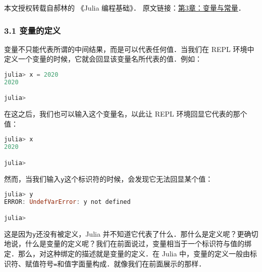 
本文授权转载自郝林的 《Julia 编程基础》． 原文链接：\href{https://github.com/hyper0x/JuliaBasics/blob/master/book/ch03.md}{第3章：变量与常量}．

\subsubsection{3.1 变量的定义}

变量不只能代表所谓的中间结果，而是可以代表任何值．当我们在 REPL 环境中定义一个变量的时候，它就会回显该变量名所代表的值．例如：

\begin{lstlisting}[language=julia]
julia> x = 2020
2020

julia> 
\end{lstlisting}

在这之后，我们也可以输入这个变量名，以此让 REPL 环境回显它代表的那个值：

\begin{lstlisting}[language=julia]
julia> x
2020

julia> 
\end{lstlisting}

然而，当我们输入\verb|y|这个标识符的时候，会发现它无法回显某个值：

\begin{lstlisting}[language=julia]
julia> y
ERROR: UndefVarError: y not defined

julia> 
\end{lstlisting}

这是因为\verb|y|还没有被定义，Julia 并不知道它代表了什么．那什么是定义呢？更确切地说，什么是变量的定义呢？我们在前面说过，变量相当于一个标识符与值的绑定．那么，对这种绑定的描述就是变量的定义．在 Julia 中，变量的定义一般由标识符、赋值符号\verb|=|和值字面量构成．就像我们在前面展示的那样．
